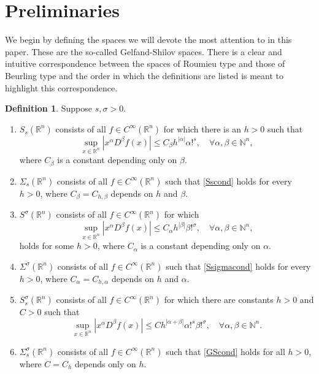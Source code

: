 \documentclass[11pt,a4paper,reqno]{amsart}
\numberwithin{equation}{section}
\theoremstyle{definition}
\theoremstyle{definition}
\newtheorem{definition}[thm]{Definition}
\begin{document}
\section{Preliminaries}\label{sec:prelim}
We begin by defining the spaces we will devote the most attention to in this paper. These are the so-called Gelfand-Shilov spaces. There is a clear and intuitive correspondence between the spaces of Roumieu type and those of Beurling type and the order in which the definitions are listed is meant to highlight this correspondence.
\begin{definition}
 Suppose $s,\sigma>0$. 
 \begin{enumerate}[label=(\roman*)]
     \item $S_s(\mathbb{R}^n)$ consists of all $f\in C^\infty(\mathbb{R}^n)$ for which there is an $h>0$ such that
     \begin{equation}\label{Sscond}
     \sup_{x\in \mathbb{R}^n} | x^\alpha D^\beta f(x) | \leq C_\beta h^{|\alpha|} \alpha!^s, \quad \forall \alpha,\beta\in\mathbb{N}^n,
     \end{equation}
      where $C_\beta$ is a constant depending only on $\beta$. 
      
      \item $\Sigma_s(\mathbb{R}^n)$ consists of all $f\in C^\infty(\mathbb{R}^n)$ such that \eqref{Sscond} holds for every $h>0$, where $C_\beta = C_{h,\beta}$ depends on $h$ and $\beta$.
      
     \item $S^\sigma(\mathbb{R}^n)$ consists of all $f\in C^\infty(\mathbb{R}^n)$ for which
     \begin{equation}\label{Ssigmacond}
     \sup_{x\in \mathbb{R}^n} | x^\alpha D^\beta f(x) | \leq C_\alpha h^{|\beta|} \beta!^\sigma, \quad \forall \alpha,\beta\in\mathbb{N}^n,
     \end{equation}
     holds for some $h>0$, where $C_\alpha$ is a constant depending only on $\alpha$.
     
     \item $\Sigma^\sigma(\mathbb{R}^n)$ consists of all $f\in C^\infty(\mathbb{R}^n)$ such that \eqref{Ssigmacond} holds for every $h>0$, where $C_\alpha = C_{h,\alpha}$ depends on $h$ and $\alpha$.
     
     \item $S_s^\sigma(\mathbb{R}^n)$ consists of all $f\in C^\infty(\mathbb{R}^n)$ for which there are constants $h>0$ and $C>0$ such that
     \begin{equation}\label{GScond}
     \sup_{x \in \mathbb{R}^n}|x^\alpha D^\beta f(x) | \leq C h^{|\alpha + \beta|} \alpha!^s \beta!^\sigma, \quad \forall \alpha,\beta\in\mathbb{N}^n.
     \end{equation}
     
     \item $\Sigma_s^\sigma(\mathbb{R}^n)$ consists of all $f\in C^\infty(\mathbb{R}^n)$ such that \eqref{GScond} holds for all $h>0$, where $C=C_h$ depends only on $h$.
 \end{enumerate}
\end{definition}
\end{document}
